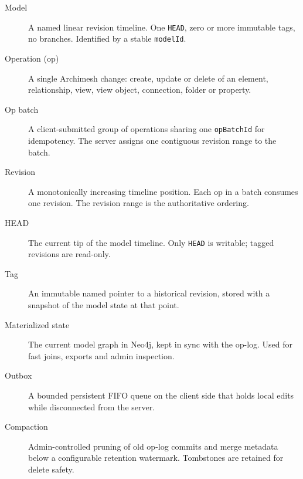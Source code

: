 \begin{description}
\item[Model] A named linear revision timeline. One \texttt{HEAD}, zero or more
  immutable tags, no branches. Identified by a stable \texttt{modelId}.
\item[Operation (op)] A single Archimesh change: create, update or delete of an
  element, relationship, view, view object, connection, folder or property.
\item[Op batch] A client-submitted group of operations sharing one
  \texttt{opBatchId} for idempotency. The server assigns one contiguous
  revision range to the batch.
\item[Revision] A monotonically increasing timeline position. Each op in a
  batch consumes one revision. The revision range is the authoritative ordering.
\item[HEAD] The current tip of the model timeline. Only \texttt{HEAD} is
  writable; tagged revisions are read-only.
\item[Tag] An immutable named pointer to a historical revision, stored with a
  snapshot of the model state at that point.
\item[Materialized state] The current model graph in Neo4j, kept in sync with
  the op-log. Used for fast joins, exports and admin inspection.
\item[Outbox] A bounded persistent FIFO queue on the client side that holds
  local edits while disconnected from the server.
\item[Compaction] Admin-controlled pruning of old op-log commits and merge
  metadata below a configurable retention watermark. Tombstones are retained
  for delete safety.
\end{description}
